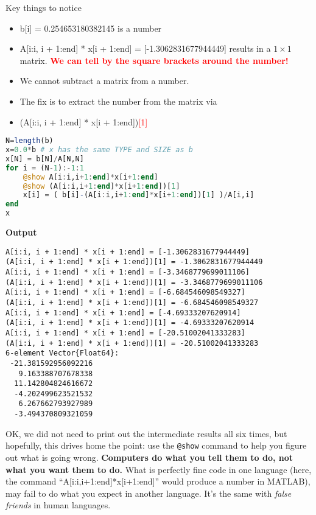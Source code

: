 Key things to notice
\begin{itemize}
    \item b[i] = 0.254653180382145 is a number
    \item A[i:i, i + 1:end] * x[i + 1:end] = [-1.3062831677944449] results in a $1 \times 1$ matrix. \textcolor{red}{\bf We can tell by the square brackets around the number!}
    \item We cannot subtract a matrix from a number. 
    \item The fix is to extract the number from the matrix via
    \item (A[i:i, i + 1:end] * x[i + 1:end])\textcolor{red}{[1]}    
\end{itemize}

\begin{lstlisting}[language=Julia,style=mystyle]
N=length(b)
x=0.0*b # x has the same TYPE and SIZE as b
x[N] = b[N]/A[N,N]
for i = (N-1):-1:1
    @show A[i:i,i+1:end]*x[i+1:end]
    @show (A[i:i,i+1:end]*x[i+1:end])[1]
    x[i] = ( b[i]-(A[i:i,i+1:end]*x[i+1:end])[1] )/A[i,i]
end
x
\end{lstlisting}
\textbf{Output} 
\begin{verbatim}
A[i:i, i + 1:end] * x[i + 1:end] = [-1.3062831677944449]
(A[i:i, i + 1:end] * x[i + 1:end])[1] = -1.3062831677944449
A[i:i, i + 1:end] * x[i + 1:end] = [-3.3468779699011106]
(A[i:i, i + 1:end] * x[i + 1:end])[1] = -3.3468779699011106
A[i:i, i + 1:end] * x[i + 1:end] = [-6.684546098549327]
(A[i:i, i + 1:end] * x[i + 1:end])[1] = -6.684546098549327
A[i:i, i + 1:end] * x[i + 1:end] = [-4.69333207620914]
(A[i:i, i + 1:end] * x[i + 1:end])[1] = -4.69333207620914
A[i:i, i + 1:end] * x[i + 1:end] = [-20.51002041333283]
(A[i:i, i + 1:end] * x[i + 1:end])[1] = -20.51002041333283
6-element Vector{Float64}:
 -21.381592956092216
   9.163388707678338
  11.142804824616672
  -4.202499623521532
   6.267662793927989
  -3.494370809321059
\end{verbatim}

OK, we did not need to print out the intermediate results all six times, but hopefully, this drives home the point: use the \texttt{@show} command to help you figure out what is going wrong. \textbf{Computers do what you tell them to do, not what you want them to do.} What is perfectly fine code in one language (here, the command ``A[i:i,i+1:end]*x[i+1:end]'' would produce a number in MATLAB), may fail to do what you expect in another language. It's the same with \textit{false friends} in human languages. 



